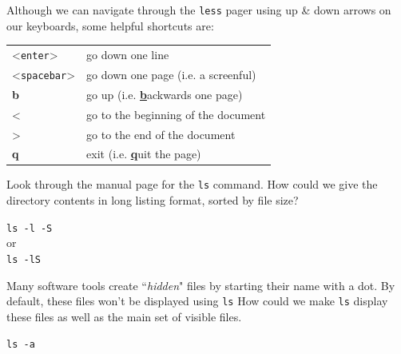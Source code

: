 \documentclass[a4paper,12pt,twoside]{memoir}
\begin{document}
\begin{information}
Although we can navigate through the \texttt{less} pager using up \& down arrows on our keyboards, some helpful shortcuts are:\\

\begin{center}
   \begin{tabular}{p{4cm} p{8cm}}
     \hline
     \textless\texttt{enter}\textgreater & go down one line \\
     \textless\texttt{spacebar}\textgreater & go down one page (i.e. a screenful) \\
     \textbf{b} & go up (i.e. \textbf{\underline{b}}ackwards one page) \\
     \textless & go to the beginning of the document \\
     \textgreater & go to the end of the document \\
     \textbf{q} & exit (i.e. \textbf{\underline{q}}uit the page) \\
     \hline
   \end{tabular}
\end{center}
\end{information}

\begin{questions}
Look through the manual page for the \texttt{ls} command.
How could we give the directory contents in long listing format, sorted by file size? \\
\begin{answer}
\texttt{ls -l -S ~} \\
or \\
\texttt{ls -lS ~} \\
\end{answer}

Many software tools create ``\textit{hidden}" files by starting their name with a dot.
By default, these files won't be displayed using \texttt{ls}
How could we make \texttt{ls}  display these files as well as the main set of visible files.

\begin{answer}
\texttt{ls -a ~} \\
\end{answer}
\end{questions}
\end{document}
